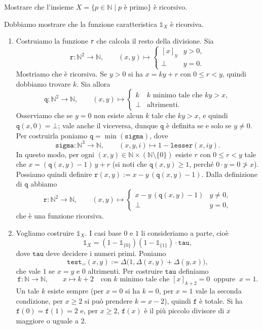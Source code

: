 \begin{ex}
Mostrare che l'insieme $X=\{p\in\mathbb N\mid p\text{ è primo}\}$ è ricorsivo.
\end{ex}

\begin{sol}
Dobbiamo mostrare che la funzione caratteristica $\mathbb 1_X$ è ricorsiva.
\ 
\begin{enumerate}
\item Costruiamo la funzione \texttt{r} che calcola il resto della divisione. Sia
\[
\texttt{r}\colon\mathbb N^2\to\mathbb N,\qquad
(x,y)\longmapsto
\begin{cases}
[x]_y & y>0,\\
\bot & y=0.
\end{cases}
\]
Mostriamo che è ricorsiva. Se $y>0$ si ha $x=ky+r$ con $0\le r<y$, quindi dobbiamo trovare $k$. Sia allora
\[
\texttt{q}\colon\mathbb N^2\to\mathbb N,\qquad
(x,y)\longmapsto
\begin{cases}
k & k\text{ minimo tale che }ky>x,\\
\bot & \text{altrimenti.}
\end{cases}
\]
Osserviamo che se $y=0$ non esiste alcun $k$ tale che $ky>x$, e quindi $\texttt{q}(x,0)=\bot$; vale anche il viceversa, dunque $\texttt{q}$ è definita se e solo se $y\neq0$. Per costruirla poniamo $\texttt{q}=\min(\texttt{sigma})$, dove
\[
\texttt{sigma}\colon\mathbb N^3\to\mathbb N,\qquad (x,y,i)\longmapsto 1-\texttt{lesser}(x,iy).
\]
In questo modo, per ogni $(x,y)\in\mathbb N\times(\mathbb N\setminus\{0\})$ esiste $r$ con $0\le r<y$ tale che $x=(\texttt{q}(x,y)-1)\,y+r$ (si noti che $\texttt{q}(x,y)\ge1$, perché $0\cdot y=0\not>x$). Possiamo quindi definire $\texttt{r}(x,y):=x-y\,(\texttt{q}(x,y)-1)$. Dalla definizione di $\texttt{q}$ abbiamo
\[
\texttt{r}\colon\mathbb N^2\to\mathbb N,\qquad
(x,y)\longmapsto
\begin{cases}
x-y\,(\texttt{q}(x,y)-1) & y\neq0,\\
\bot & y=0,
\end{cases}
\]
che è una funzione ricorsiva.

\item Vogliamo costruire $\mathbb 1_X$. I casi base $0$ e $1$ li consideriamo a parte, cioè
\[
\mathbb 1_X=(1-\mathbb 1_{\{0\}})(1-\mathbb 1_{\{1\}})\cdot\texttt{tau},
\]
dove $\texttt{tau}$ deve decidere i numeri primi. Poniamo
\[
\texttt{test}_{=}(x,y):=\Delta\big(1,\Delta(x,y)+\Delta(y,x)\big),
\]
che vale $1$ se $x=y$ e $0$ altrimenti. Per costruire $\texttt{tau}$ definiamo
\[
\texttt{f}\colon\mathbb N\to\mathbb N,\qquad
x\longmapsto k+2\quad\text{con $k$ minimo tale che }[x]_{k+2}=0\ \text{ oppure }\ x=1.
\]
Un tale $k$ esiste sempre (per $x=0$ si ha $k=0$, per $x=1$ vale la seconda condizione, per $x\ge2$ si può prendere $k=x-2$), quindi $\texttt{f}$ è totale. Si ha $\texttt{f}(0)=\texttt{f}(1)=2$ e, per $x\ge2$, $\texttt{f}(x)$ è il più piccolo divisore di $x$ maggiore o uguale a $2$.


\end{enumerate}
\end{sol}
